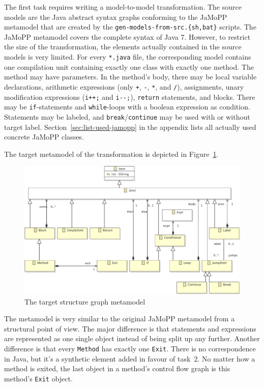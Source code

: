 \documentclass[11pt]{article}
\begin{document}
The first task requires writing a model-to-model transformation.  The source
models are the Java abstract syntax graphs conforming to the JaMoPP metamodel
that are created by the \verb$gen-models-from-src.{sh,bat}$ scripts.  The
JaMoPP metamodel covers the complete syntax of Java 7.  However, to restrict
the size of the transformation, the elements actually contained in the source
models is very limited.  For every \verb|*.java| file, the corresponding model
contains one compilation unit containing exactly one class with exactly one
method.  The method may have parameters.  In the method's body, there may be
local variable declarations, arithmetic expressions (only \verb|+|, \verb|-|,
\verb|*|, and \verb|/|), assignments, unary modification expressions
(\verb|i++;| and \verb|i--;|), \verb|return| statements, and blocks.  There may
be \verb|if|-statements and \verb|while|-loops with a boolean expression as
condition.  Statements may be labeled, and \verb|break|/\verb|continue| may be
used with or without target label.  Section~\ref{sec:list-used-jamopp} in the
appendix lists all actually used concrete JaMoPP classes.

The target metamodel of the transformation is depicted in
Figure~\ref{fig:structure-graph-mm}.

\begin{figure}[h!]
  \centering
  \includegraphics[width=\linewidth]{../metamodel/StructureGraph}
  \caption{The target structure graph metamodel}
  \label{fig:structure-graph-mm}
\end{figure}

The metamodel is very similar to the original JaMoPP metamodel from a
structural point of view.  The major difference is that statements and
expressions are represented as one single object instead of being split up any
further.  Another difference is that every \verb|Method| has exactly one
\verb|Exit|.  There is no correspondence in Java, but it's a synthetic element
added in favour of task~2.  No matter how a method is exited, the last object
in a method's control flow graph is this method's \verb|Exit| object.
\end{document}
